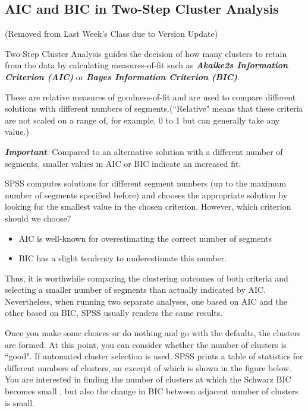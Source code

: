 \documentclass[a4paper,12pt]{article}
\begin{document}
\subsection{AIC and BIC in Two-Step Cluster Analysis}

(Removed from Last Week's Class due to Version Update)

Two-Step Cluster Analysis guides the decision of how many clusters to retain from the data by
calculating measures-of-fit such as \textbf{\textit{Akaike\92s Information Criterion (AIC)}} or \textbf{\textit{Bayes Information Criterion (BIC)}}.

These are relative measures of goodness-of-fit and are used to compare different
solutions with different numbers of segments.(``Relative" means that these criteria
are not scaled on a range of, for example, 0 to 1 but can generally take any value.)


\textbf{\textit{Important}}: Compared to an alternative solution with a different number of segments, smaller
values in AIC or BIC indicate an increased fit.

SPSS computes solutions for different segment numbers (up to the maximum number of segments specified before) and
chooses the appropriate solution by looking for the smallest value in the chosen
criterion. However, which criterion should we choose?
\begin{itemize}
	\item AIC is well-known for
	overestimating the correct number of segments
	\item BIC has a slight tendency
	to underestimate this number.
\end{itemize}

Thus, it is worthwhile comparing the clustering
outcomes of both criteria and selecting a smaller number of segments than
actually indicated by AIC. Nevertheless, when running two separate analyses,
one based on AIC and the other based on BIC, SPSS usually renders the same
results.

Once you make some choices or do nothing and go with the defaults, the clusters are
formed. At this point, you can consider whether the number of clusters is ``good". If
automated cluster selection is used, SPSS prints a table of statistics for different
numbers of clusters, an excerpt of which is shown in the figure below. You are interested
in finding the number of clusters at which the Schwarz BIC becomes small , but also the change in BIC between
adjacent number of clusters is small. 
\end{document}
